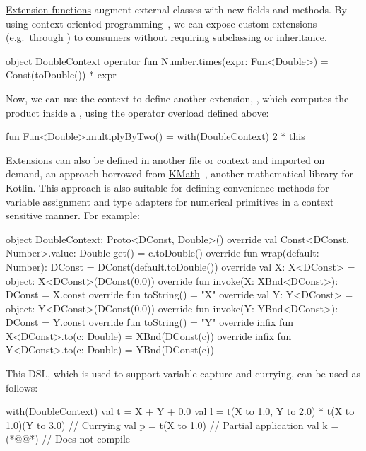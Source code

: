 \href{https://kotlinlang.org/docs/reference/extensions.html}{Extension functions} augment external classes with new fields and methods. By using context-oriented programming~\citep{hirschfeld2008context}, we can expose custom extensions (e.g.\ through ) to consumers without requiring subclassing or inheritance.
%
\begin{kotlinlisting}[caption={We can provide numerical extensions, wrapped in a context.}]
object DoubleContext {
    operator fun Number.times(expr: Fun<Double>) = Const(toDouble()) * expr
}
\end{kotlinlisting}
%
Now, we can use the context to define another extension, , which computes the product inside a , using the operator overload defined above:
%
\begin{kotlinlisting}
fun Fun<Double>.multiplyByTwo() = with(DoubleContext) { 2 * this }
\end{kotlinlisting}
%
Extensions can also be defined in another file or context and imported on demand, an approach borrowed from \href{https://github.com/mipt-npm/kmath}{KMath}~\citep{nozik2019kmath}, another mathematical library for Kotlin. This approach is also suitable for defining convenience methods for variable assignment and type adapters for numerical primitives in a context sensitive manner. For example:
%
\begin{kotlinlisting}
object DoubleContext: Proto<DConst, Double>() {
    override val Const<DConst, Number>.value: Double
    get() = c.toDouble()
    override fun wrap(default: Number): DConst = DConst(default.toDouble())
    override val X: X<DConst> = object: X<DConst>(DConst(0.0)) {
        override fun invoke(X: XBnd<DConst>): DConst = X.const
        override fun toString() = "X"
    }
    override val Y: Y<DConst> = object: Y<DConst>(DConst(0.0)) {
        override fun invoke(Y: YBnd<DConst>): DConst = Y.const
        override fun toString() = "Y"
    }
    override infix fun X<DConst>.to(c: Double) = XBnd(DConst(c))
    override infix fun Y<DConst>.to(c: Double) = YBnd(DConst(c))
}
\end{kotlinlisting}
%
This DSL, which is used to support variable capture and currying, can be used as follows:
%
\begin{kotlinlisting}
with(DoubleContext) {
    val t = X + Y + 0.0
    val l = t(X to 1.0, Y to 2.0) * t(X to 1.0)(Y to 3.0) // Currying
    val p = t(X to 1.0) // Partial application
    val k = (*@@*) // Does not compile
}
\end{kotlinlisting}

